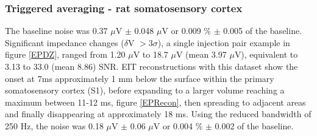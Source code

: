\subsubsection{Triggered averaging - rat somatosensory cortex}

The baseline noise was 0.37 $\mu$V $\pm$ 0.048 $\mu$V or 0.009 \% $\pm$ 0.005 of the baseline. Significant impedance changes ($\delta$V $> 3\sigma$), a single injection pair example in figure \ref{EPDZ}, ranged from 1.20 $\mu$V to 18.7 $\mu$V (mean 3.97 $\mu$V), equivalent to 3.13 to 33.0 (mean 8.86) SNR. EIT reconstructions with this dataset show the onset at 7ms approximately 1 mm below the surface within the primary somatosensory cortex (S1), before expanding to a larger volume reaching a maximum between 11-12 ms, figure \ref{EPRecon}, then spreading to adjacent areas and finally disappearing at approximately 18 ms. Using the reduced bandwidth of 250 Hz, the noise was 0.18 $\mu$V $\pm$ 0.06 $\mu$V or 0.004 \% $\pm$ 0.002 of the baseline.
